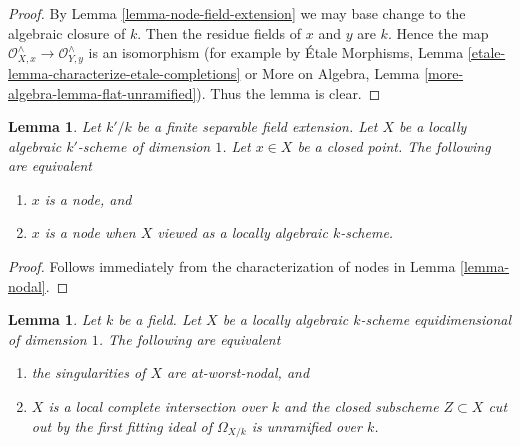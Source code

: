 \documentclass{stacks-project}
\theoremstyle{plain}
\newtheorem{lemma}[subsection]{Lemma}
\theoremstyle{definition}
\theoremstyle{remark}
\numberwithin{equation}{subsection}
\begin{document}
\begin{proof}
By Lemma \ref{lemma-node-field-extension}
we may base change to the algebraic closure of $k$.
Then the residue fields of $x$ and $y$ are $k$.
Hence the map $\mathcal{O}_{X, x}^\wedge \to \mathcal{O}_{Y, y}^\wedge$
is an isomorphism (for example by
\'Etale Morphisms, Lemma \ref{etale-lemma-characterize-etale-completions} or
More on Algebra, Lemma \ref{more-algebra-lemma-flat-unramified}).
Thus the lemma is clear.
\end{proof}

\begin{lemma}
\label{lemma-node-over-separable-extension}
Let $k'/k$ be a finite separable field extension.
Let $X$ be a locally algebraic $k'$-scheme of dimension $1$.
Let $x \in X$ be a closed point. The following are equivalent
\begin{enumerate}
\item $x$ is a node, and
\item $x$ is a node when $X$ viewed as a locally algebraic $k$-scheme.
\end{enumerate}
\end{lemma}

\begin{proof}
Follows immediately from the characterization of nodes in
Lemma \ref{lemma-nodal}.
\end{proof}

\begin{lemma}
\label{lemma-nodal-lci}
Let $k$ be a field. Let $X$ be a locally algebraic $k$-scheme
equidimensional of dimension $1$.
The following are equivalent
\begin{enumerate}
\item the singularities of $X$ are at-worst-nodal, and
\item $X$ is a local complete intersection over $k$
and the closed subscheme $Z \subset X$ cut out by the
first fitting ideal of $\Omega_{X/k}$ is unramified over $k$.
\end{enumerate}
\end{lemma}
\end{document}

